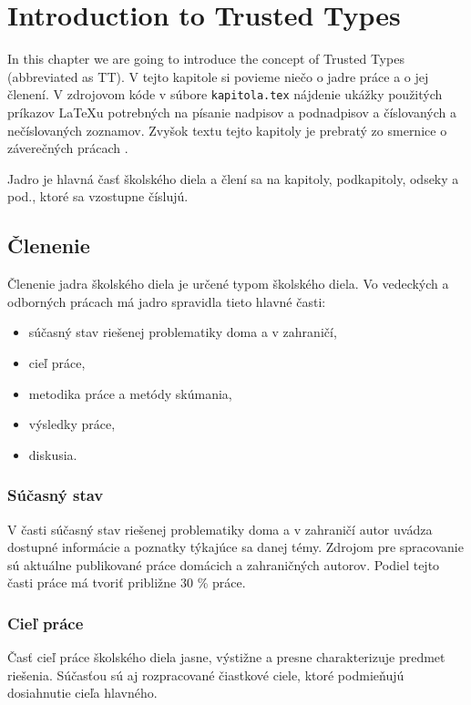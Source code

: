 \chapter{Introduction to Trusted Types}

\label{chapter:intro-tt} %

In this chapter we are going to introduce the concept of Trusted Types (abbreviated as TT).
V tejto kapitole si povieme niečo o jadre práce a o jej členení. V zdrojovom kóde v súbore
\verb'kapitola.tex' nájdenie ukážky použitých príkazov LaTeXu potrebných na písanie nadpisov a
podnadpisov a číslovaných a nečíslovaných zoznamov. Zvyšok textu tejto kapitoly je prebratý zo
smernice o záverečných prácach \cite[článok 5]{smernica}.

Jadro je hlavná časť školského diela a člení sa na kapitoly, podkapitoly, odseky a pod., ktoré sa
vzostupne číslujú.

\section{Členenie}
Členenie jadra školského diela je určené typom  školského diela. Vo vedeckých a odborných prácach má
jadro spravidla tieto hlavné časti:
\begin{itemize}
  \item  súčasný stav riešenej problematiky doma a v zahraničí,
  \item  cieľ práce,
  \item  metodika práce a metódy skúmania,
  \item  výsledky práce,
  \item  diskusia.
\end{itemize}

\subsection{Súčasný stav}
V časti súčasný stav riešenej problematiky doma a v zahraničí autor uvádza dostupné informácie a
poznatky týkajúce sa danej témy. Zdrojom pre spracovanie sú aktuálne publikované práce domácich a
zahraničných autorov.  Podiel tejto časti práce má tvoriť približne 30 \% práce.

\subsection{Cieľ práce}
Časť cieľ práce  školského diela jasne, výstižne a presne charakterizuje predmet riešenia. Súčasťou
sú aj rozpracované čiastkové ciele, ktoré podmieňujú dosiahnutie cieľa hlavného.

